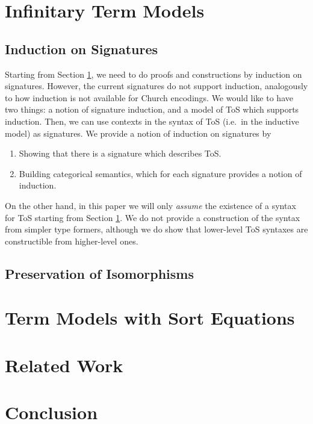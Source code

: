 \documentclass{llncs}
\begin{document}
\section{Infinitary Term Models}
\label{sec:infinitary_term_models}

\subsection{Induction on Signatures}


Starting from Section \ref{sec:infinitary_term_models}, we need to do proofs and
constructions by induction on signatures. However, the current signatures do not
support induction, analogously to how induction is not available for Church
encodings. We would like to have two things: a notion of signature induction,
and a model of ToS which supports induction. Then, we can use contexts in the
syntax of ToS (i.e.\ in the inductive model) as signatures. We provide a notion
of induction on signatures by
\begin{enumerate}
  \item Showing that there is a signature which describes ToS.
  \item Building categorical semantics, which for each signature provides a notion of induction.
\end{enumerate}
On the other hand, in this paper we will only \emph{assume} the existence of a
syntax for ToS starting from Section \ref{sec:infinitary_term_models}. We do not provide a
construction of the syntax from simpler type formers, although we do show that
lower-level ToS syntaxes are constructible from higher-level ones.

\subsection{Preservation of Isomorphisms}

\section{Term Models with Sort Equations}
\label{sec:sort_term}

\section{Related Work}
\label{sec:related}

\section{Conclusion}
\label{sec:conclusion}



\end{document}

